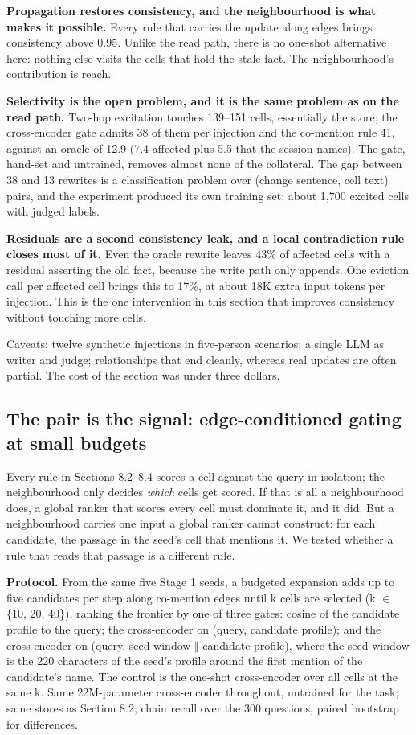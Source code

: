 \documentclass[11pt]{article}
\begin{document}
\textbf{Propagation restores consistency, and the neighbourhood is what makes it possible.} Every rule that carries the update along edges brings consistency above 0.95. Unlike the read path, there is no one-shot alternative here: nothing else visits the cells that hold the stale fact. The neighbourhood's contribution is reach.

\textbf{Selectivity is the open problem, and it is the same problem as on the read path.} Two-hop excitation touches 139--151 cells, essentially the store; the cross-encoder gate admits 38 of them per injection and the co-mention rule 41, against an oracle of 12.9 (7.4 affected plus 5.5 that the session names). The gate, hand-set and untrained, removes almost none of the collateral. The gap between 38 and 13 rewrites is a classification problem over (change sentence, cell text) pairs, and the experiment produced its own training set: about 1,700 excited cells with judged labels.

\textbf{Residuals are a second consistency leak, and a local contradiction rule closes most of it.} Even the oracle rewrite leaves 43\% of affected cells with a residual asserting the old fact, because the write path only appends. One eviction call per affected cell brings this to 17\%, at about 18K extra input tokens per injection. This is the one intervention in this section that improves consistency without touching more cells.

Caveats: twelve synthetic injections in five-person scenarios; a single LLM as writer and judge; relationships that end cleanly, whereas real updates are often partial. The cost of the section was under three dollars.

\subsection{The pair is the signal: edge-conditioned gating at small budgets}

Every rule in Sections 8.2--8.4 scores a cell against the query in isolation; the neighbourhood only decides \emph{which} cells get scored. If that is all a neighbourhood does, a global ranker that scores every cell must dominate it, and it did. But a neighbourhood carries one input a global ranker cannot construct: for each candidate, the passage in the seed's cell that mentions it. We tested whether a rule that reads that passage is a different rule.

\textbf{Protocol.} From the same five Stage 1 seeds, a budgeted expansion adds up to five candidates per step along co-mention edges until k cells are selected (k $\in$ \{10, 20, 40\}), ranking the frontier by one of three gates: cosine of the candidate profile to the query; the cross-encoder on (query, candidate profile); and the cross-encoder on (query, seed-window $\Vert$ candidate profile), where the seed window is the 220 characters of the seed's profile around the first mention of the candidate's name. The control is the one-shot cross-encoder over all cells at the same k. Same 22M-parameter cross-encoder throughout, untrained for the task; same stores as Section 8.2; chain recall over the 300 questions, paired bootstrap for differences.
\end{document}
